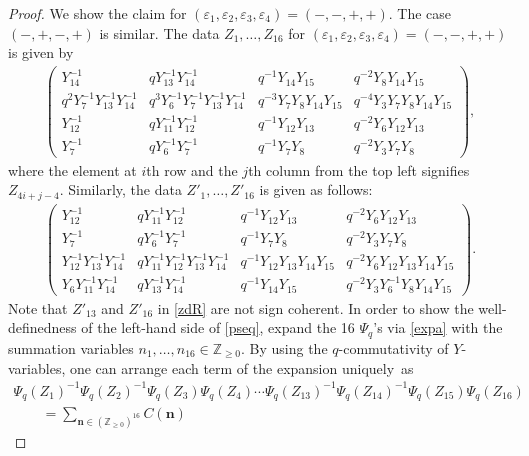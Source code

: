 \documentclass[11pt]{article}
\numberwithin{equation}{section}
\newcommand{\Z}{{\mathbb Z}}
\numberwithin{equation}{section}
\begin{document}
\begin{proof}
 We show the claim for
 $(\varepsilon_1,\varepsilon_2,\varepsilon_3,\varepsilon_4)
 =(-,-,+,+)$. The case $(-,+,-,+)$ is similar. The data $Z_1,
 \dots, Z_{16}$ for
 $(\varepsilon_1,\varepsilon_2,\varepsilon_3,\varepsilon_4)=(-,-,+,+)$
 is given by
\begin{align}\label{zdL}
\begin{pmatrix}
Y_{14}^{-1} &
qY^{-1}_{13}Y^{-1}_{14} &
q^{-1}Y_{14}Y_{15} &
q^{-2}Y_{8}Y_{14}Y_{15}
\\
q^{2}Y^{-1}_7Y^{-1}_{13}Y^{-1}_{14} &
q^3Y^{-1}_6Y^{-1}_7Y^{-1}_{13}Y^{-1}_{14} &
q^{-3}Y_7Y_8Y_{14}Y_{15} &
q^{-4}Y_3Y_7Y_8Y_{14}Y_{15}
\\
Y^{-1}_{12} &
qY^{-1}_{11}Y^{-1}_{12} &
q^{-1}Y_{12}Y_{13}&
q^{-2}Y_6Y_{12} Y_{13}
\\
Y^{-1}_{7} &
qY^{-1}_6Y^{-1}_7 &
q^{-1}Y_7Y_8 &
q^{-2}Y_3Y_7Y_8
\end{pmatrix},
\end{align}
where the element at $i$th row and the $j$th column from the top left signifies
$Z_{4i+j-4}$.
%
Similarly,
the data $Z'_1, \dotsc, Z'_{16}$
is given as follows:
\begin{align}\label{zdR}
\begin{pmatrix}
Y^{-1}_{12} &
qY^{-1}_{11}Y^{-1}_{12} &
q^{-1}Y_{12} Y_{13}&
q^{-2}Y_6Y_{12} Y_{13}
\\
Y^{-1}_7 &
qY^{-1}_6Y^{-1}_7 &
q^{-1}Y_7Y_8 &
q^{-2}Y_3Y_7Y_8
\\
Y^{-1}_{12}Y^{-1}_{13}Y^{-1}_{14} &
qY^{-1}_{11}Y^{-1}_{12}Y^{-1}_{13}Y^{-1}_{14} &
q^{-1}Y_{12} Y_{13} Y_{14} Y_{15} &
q^{-2}Y_6Y_{12} Y_{13} Y_{14} Y_{15}
\\
Y_6Y^{-1}_{11}Y^{-1}_{14} &
qY^{-1}_{13}Y^{-1}_{14} &
q^{-1}Y_{14}Y_{15} &
q^{-2}Y_3Y^{-1}_6Y_8Y_{14}Y_{15}
\end{pmatrix}.
\end{align}
%
Note that $Z'_{13}$ and $Z'_{16}$ in \eqref{zdR} are not sign
coherent. In order to show the well-definedness of the left-hand side of
\eqref{pseq}, expand the 16 $\Psi_q$'s via \eqref{expa} with the
summation variables $n_1, \dots, n_{16} \in \Z_{\ge 0}$. By using
the $q$-commutativity of $Y$-variables, one can arrange each term of
the expansion uniquely~as
\begin{gather}
\Psi_q(Z_1)^{-1}\Psi_q(Z_2)^{-1}\Psi_q(Z_3)\Psi_q(Z_4)
\dotsm \Psi_q(Z_{13})^{-1}\Psi_q(Z_{14})^{-1}\Psi_q(Z_{15})\Psi_q(Z_{16})\nonumber
 \\
 \qquad= \sum_{\mathbf{n} \in (\Z_{\ge 0})^{16}}C(\mathbf{n})

\end{gather}
\end{proof}
\end{document}
